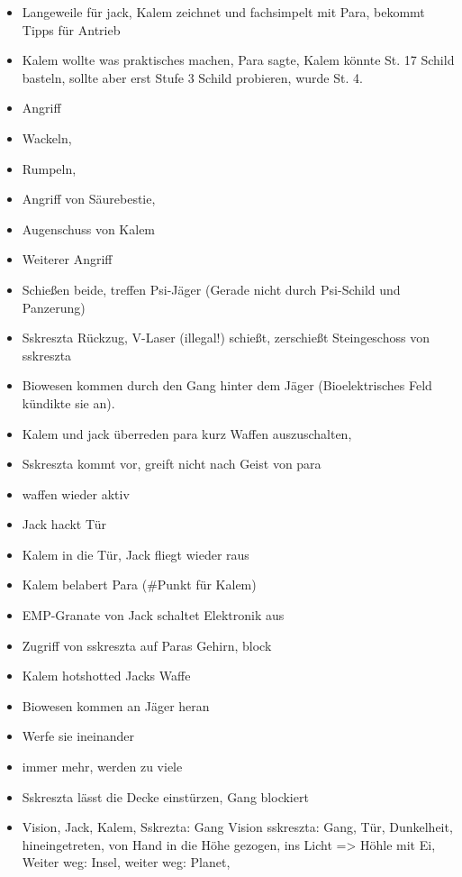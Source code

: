 \documentclass[11pt]{scrartcl}
\begin{document}
\begin{itemize}
  \begin{itemize}
  \item
    Langeweile für jack, Kalem zeichnet und fachsimpelt mit Para,
    bekommt Tipps für Antrieb
  \item
    Kalem wollte was praktisches machen, Para sagte, Kalem könnte St. 17
    Schild basteln, sollte aber erst Stufe 3 Schild probieren, wurde St.
    4.
  \item
    Angriff
  \item
    Wackeln,
  \item
    Rumpeln,
  \item
    Angriff von Säurebestie,
  \item
    Augenschuss von Kalem
  \item
    Weiterer Angriff
  \item
    Schießen beide, treffen Psi-Jäger (Gerade nicht durch Psi-Schild und
    Panzerung)
  \item
    Sskreszta Rückzug, V-Laser (illegal!) schießt, zerschießt
    Steingeschoss von sskreszta
  \item
    Biowesen kommen durch den Gang hinter dem Jäger (Bioelektrisches
    Feld kündikte sie an).
  \item
    Kalem und jack überreden para kurz Waffen auszuschalten,
  \item
    Sskreszta kommt vor, greift nicht nach Geist von para
  \item
    waffen wieder aktiv
  \item
    Jack hackt Tür
  \item
    Kalem in die Tür, Jack fliegt wieder raus
  \item
    Kalem belabert Para (\#Punkt für Kalem)
  \item
    EMP-Granate von Jack schaltet Elektronik aus
  \item
    Zugriff von sskreszta auf Paras Gehirn, block
  \item
    Kalem hotshotted Jacks Waffe
  \item
    Biowesen kommen an Jäger heran
  \item
    Werfe sie ineinander
  \item
    immer mehr, werden zu viele
  \item
    Sskreszta lässt die Decke einstürzen, Gang blockiert
  \item
    Vision, Jack, Kalem, Sskrezta: Gang Vision sskreszta: Gang, Tür,
    Dunkelheit, hineingetreten, von Hand in die Höhe gezogen, ins Licht
    =\textgreater{} Höhle mit Ei, Weiter weg: Insel, weiter weg: Planet,

\end{itemize}
\end{itemize}
\end{document}
